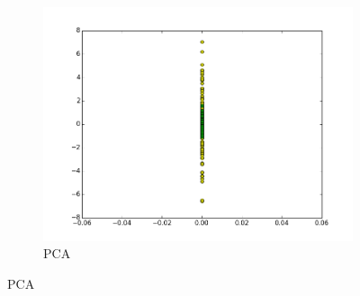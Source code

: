 \documentclass[a4paper,12pt]{article}    %
\begin{document}
\begin{figure}[!ht]
\begin{subfigure}{.45\textwidth}
		\includegraphics[width=\linewidth]{img/9pca.png}
		\caption{PCA}
	\end{subfigure}
	\label{dataset3}
\end{figure}
\vfill
\clearpage
\end{document}
